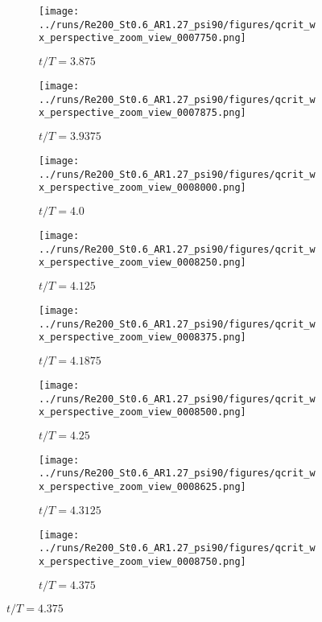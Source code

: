 \begin{figure}
  \centering
  \begin{subfigure}[b]{0.3\textwidth}
    \centering
    \texttt{[image: ../runs/Re200\_St0.6\_AR1.27\_psi90/figures/qcrit\_wx\_perspective\_zoom\_view\_0007750.png]}
    \caption{$t / T = 3.875$}
  \end{subfigure}
  \hfill
  \begin{subfigure}[b]{0.3\textwidth}
    \centering
    \texttt{[image: ../runs/Re200\_St0.6\_AR1.27\_psi90/figures/qcrit\_wx\_perspective\_zoom\_view\_0007875.png]}
    \caption{$t / T = 3.9375$}
  \end{subfigure}
  \hfill
  \begin{subfigure}[b]{0.3\textwidth}
    \centering
    \texttt{[image: ../runs/Re200\_St0.6\_AR1.27\_psi90/figures/qcrit\_wx\_perspective\_zoom\_view\_0008000.png]}
    \caption{$t / T = 4.0$}
  \end{subfigure}
  \vspace{1cm}
  \begin{subfigure}[b]{0.3\textwidth}
    \centering
    \texttt{[image: ../runs/Re200\_St0.6\_AR1.27\_psi90/figures/qcrit\_wx\_perspective\_zoom\_view\_0008250.png]}
    \caption{$t / T = 4.125$}
  \end{subfigure}
  \hfill
  \begin{subfigure}[b]{0.3\textwidth}
    \centering
    \texttt{[image: ../runs/Re200\_St0.6\_AR1.27\_psi90/figures/qcrit\_wx\_perspective\_zoom\_view\_0008375.png]}
    \caption{$t / T = 4.1875$}
  \end{subfigure}
  \hfill
  \begin{subfigure}[b]{0.3\textwidth}
    \centering
    \texttt{[image: ../runs/Re200\_St0.6\_AR1.27\_psi90/figures/qcrit\_wx\_perspective\_zoom\_view\_0008500.png]}
    \caption{$t / T = 4.25$}
  \end{subfigure}
  \vspace{1cm}
  \begin{subfigure}[b]{0.3\textwidth}
    \centering
    \texttt{[image: ../runs/Re200\_St0.6\_AR1.27\_psi90/figures/qcrit\_wx\_perspective\_zoom\_view\_0008625.png]}
    \caption{$t / T = 4.3125$}
  \end{subfigure}
  \hfill
  \begin{subfigure}[b]{0.3\textwidth}
    \centering
    \texttt{[image: ../runs/Re200\_St0.6\_AR1.27\_psi90/figures/qcrit\_wx\_perspective\_zoom\_view\_0008750.png]}
    \caption{$t / T = 4.375$}

\end{subfigure}
\end{figure}
